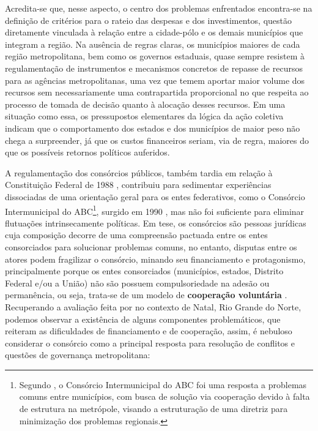 \documentclass[
article,			%
11pt,				%
oneside,			%
a4paper,			%
english,			%
brazil,				%
sumario=tradicional
]{abntex2}
\begin{document}
	\begin{citacao}
		Acredita-se que, nesse aspecto, o centro dos problemas enfrentados encontra-se na definição de critérios para o rateio das despesas e dos investimentos, questão diretamente vinculada à relação entre a cidade-pólo e os demais municípios que integram a região. Na ausência de regras claras, os municípios maiores de cada região metropolitana, bem como os governos estaduais, quase sempre resistem à regulamentação de instrumentos e mecanismos concretos de repasse de recursos para as agências metropolitanas, uma vez que temem aportar maior volume dos recursos sem necessariamente uma contrapartida proporcional no que respeita ao processo de tomada de decisão quanto à alocação desses recursos. Em uma situação como essa, os pressupostos elementares da lógica da ação coletiva indicam que o comportamento dos estados e dos municípios de maior peso não chega a surpreender, já que os custos financeiros seriam, via de regra, maiores do que os possíveis retornos políticos auferidos. \cite[p. 104]{guia2015a}
	\end{citacao}
	
	A regulamentação dos consórcios públicos, também tardia em relação à Constituição Federal de 1988 \cite{brasil2005a}, contribuiu para sedimentar experiências dissociadas de uma orientação geral para os entes federativos, como o Consórcio Intermunicipal do ABC\footnote{Segundo , o Consórcio Intermunicipal do ABC foi uma resposta a problemas comuns entre municípios, com busca de solução via cooperação devido à falta de estrutura na metrópole, visando a estruturação de uma diretriz para minimização dos problemas regionais.}, surgido em 1990 \cite[p. 398]{bresciani2015a}, mas não foi suficiente para eliminar flutuações intrinsecamente políticas. Em tese, os consórcios são pessoas jurídicas cuja composição decorre de uma compreensão pactuada entre os entes consorciados para solucionar problemas comuns, no entanto, disputas entre os atores podem fragilizar o consórcio, minando seu financiamento e protagonismo, principalmente porque os entes consorciados (municípios, estados, Distrito Federal e/ou a União) não são possuem compulsoriedade na adesão ou permanência, ou seja, trata-se de um modelo de \textbf{cooperação voluntária} \cite[p. 31]{mundial2015a}. Recuperando a avaliação feita por  no contexto de Natal, Rio Grande do Norte, podemos observar a existência de alguns componentes problemáticos, que reiteram as dificuldades de financiamento e de cooperação, assim, é nebuloso considerar o consórcio como a principal resposta para resolução de conflitos e questões de governança metropolitana:
	
\end{document}
